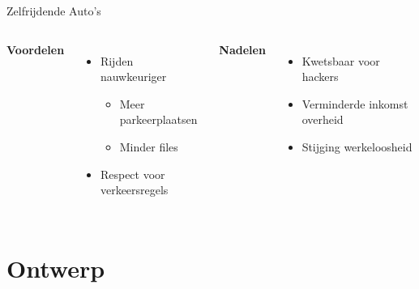 \documentclass[aspectratio=169,kulak,t,handout]{kulakbeamer} %
\begin{document}
\begin{frame}{Zelfrijdende Auto's}
	\begin{columns}
	\centering
	{\bf{Voordelen}}\\[.2cm]

		\begin{itemize}
			\item Rijden nauwkeuriger
			\begin{itemize}
				\item Meer parkeerplaatsen
				\item Minder files
			\end{itemize}
			\item Respect voor verkeersregels
			
		\end{itemize}
	\centering
	{\bf{Nadelen}}\\[.2cm]

			\begin{itemize}
			\item Kwetsbaar voor hackers
			\item Verminderde inkomst overheid
			\item Stijging werkeloosheid
			\end{itemize}
	
	\end{columns}
\end{frame}

\section{Ontwerp}
\end{document}
